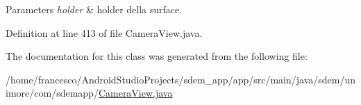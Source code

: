 \begin{DoxyParams}{Parameters}
{\em holder} & holder della surface. \\
\hline
\end{DoxyParams}


Definition at line 413 of file Camera\+View.\+java.



The documentation for this class was generated from the following file\+:\begin{DoxyCompactItemize}
\item 
/home/francesco/\+Android\+Studio\+Projects/sdem\+\_\+app/app/src/main/java/sdem/unimore/com/sdemapp/\hyperlink{_camera_view_8java}{Camera\+View.\+java}\end{DoxyCompactItemize}
